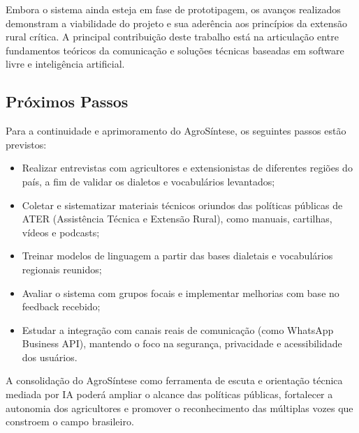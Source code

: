 Embora o sistema ainda esteja em fase de prototipagem, os avanços realizados demonstram a viabilidade do projeto e sua aderência aos princípios da extensão rural crítica. A principal contribuição deste trabalho está na articulação entre fundamentos teóricos da comunicação e soluções técnicas baseadas em software livre e inteligência artificial.

\subsection*{Próximos Passos}

Para a continuidade e aprimoramento do AgroSíntese, os seguintes passos estão previstos:

\begin{itemize}
	\item Realizar entrevistas com agricultores e extensionistas de diferentes regiões do país, a fim de validar os dialetos e vocabulários levantados;
	\item Coletar e sistematizar materiais técnicos oriundos das políticas públicas de ATER (Assistência Técnica e Extensão Rural), como manuais, cartilhas, vídeos e podcasts;
	\item Treinar modelos de linguagem a partir das bases dialetais e vocabulários regionais reunidos;
	\item Avaliar o sistema com grupos focais e implementar melhorias com base no feedback recebido;
	\item Estudar a integração com canais reais de comunicação (como WhatsApp Business API), mantendo o foco na segurança, privacidade e acessibilidade dos usuários.
\end{itemize}

A consolidação do AgroSíntese como ferramenta de escuta e orientação técnica mediada por IA poderá ampliar o alcance das políticas públicas, fortalecer a autonomia dos agricultores e promover o reconhecimento das múltiplas vozes que constroem o campo brasileiro.
